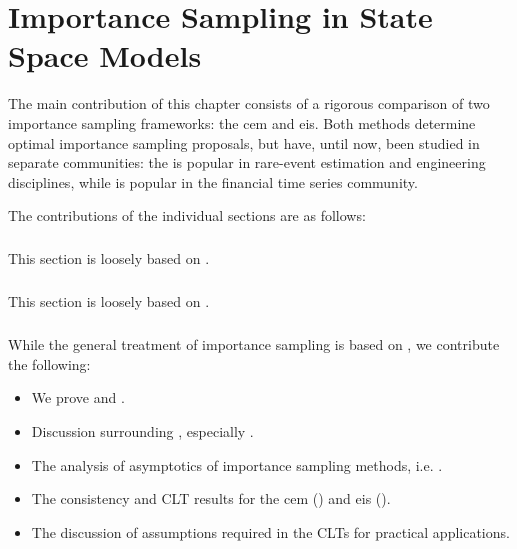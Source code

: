 \chapter{Importance Sampling in State Space Models}
\label{cha:state_space_models}
\newpage
\begin{tcolorbox}[title={Contributions}]
    The main contribution of this chapter consists of a rigorous comparison of two importance sampling frameworks: the \Acrfull{cem} and \Acrfull{eis}. Both methods determine optimal importance sampling proposals, but have, until now, been studied in separate communities: the \acem is popular in rare-event estimation and engineering disciplines, while \aeis is popular in the financial time series community. 

    The contributions of the individual sections are as follows:


    \paragraph{} This section is loosely based on \citep{Durbin2012Time}.
    \paragraph{} This section is loosely based on \citep{Durbin2012Time,Brown1986Fundamentals}.
    \paragraph{} While the general treatment of importance sampling is based on \citep{Chopin2020Introduction,Durbin2012Time}, we contribute the following:
    \begin{itemize}
        \item We prove  and .
        \item Discussion surrounding , especially .
        \item The analysis of asymptotics of importance sampling methods, i.e. .
        \item The consistency and CLT results for the \acrshort{cem} () and \acrshort{eis} ().
        \item The discussion of assumptions required in the CLTs for practical applications.
    \end{itemize}


\end{tcolorbox}
